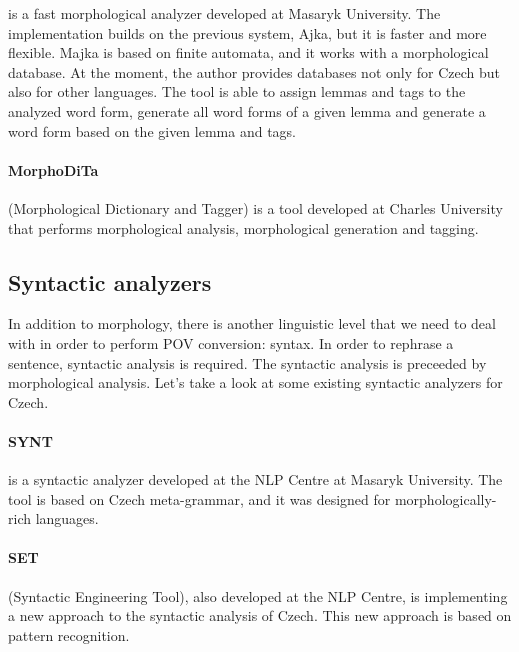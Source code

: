 is a fast morphological analyzer developed at Masaryk University. The implementation builds on the previous system, Ajka, but it is faster and more flexible. Majka is based on finite automata, and it works with a morphological database. At the moment, the author provides databases not only for Czech but also for other languages. The tool is able to assign lemmas and tags to the analyzed word form, generate all word forms of a given lemma and generate a word form based on the given lemma and tags. \cite{majka}

\paragraph{MorphoDiTa} (Morphological Dictionary and Tagger) is a tool developed at Charles University that performs morphological analysis, morphological generation and tagging. \cite{strakova14}

\subsection{Syntactic analyzers}
\label{sec:synt-an}

In addition to morphology, there is another linguistic level that we need to deal with in order to perform POV conversion: syntax. In order to rephrase a sentence, syntactic analysis is required. The syntactic analysis is preceeded by morphological analysis. Let's take a look at some existing syntactic analyzers for Czech.

\paragraph{SYNT} is a syntactic analyzer developed at the NLP Centre at Masaryk University. The tool is based on Czech meta-grammar, and it was designed for morphologically-rich languages.

\paragraph{SET} (Syntactic Engineering Tool), also developed at the NLP Centre, is implementing a new approach to the syntactic analysis of Czech. This new approach is based on pattern recognition. \cite{set}

